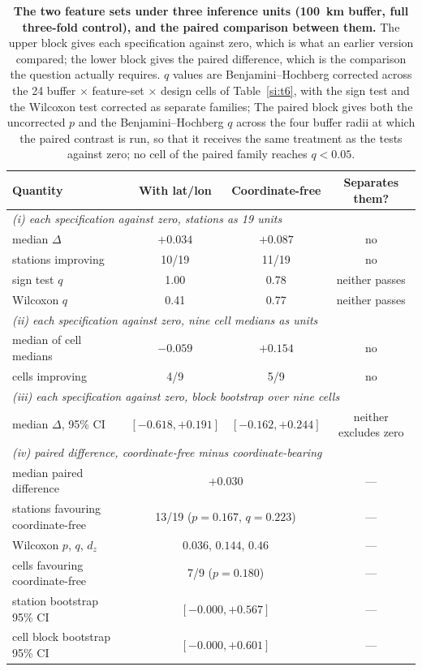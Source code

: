 \documentclass[11pt]{article}
\begin{document}
\begin{table}[htbp]\centering\footnotesize
\caption{\textbf{The two feature sets under three inference units (100~km buffer, full three-fold control), and the paired comparison between them.} The upper block gives each specification against zero, which is what an earlier version compared; the lower block gives the paired difference, which is the comparison the question actually requires. $q$ values are Benjamini--Hochberg corrected across the 24 buffer $\times$ feature-set $\times$ design cells of Table~\ref{si:t6}, with the sign test and the Wilcoxon test corrected as separate families; The paired block gives both the uncorrected $p$ and the Benjamini--Hochberg $q$ across the four buffer radii at which the paired contrast is run, so that it receives the same treatment as the tests against zero; no cell of the paired family reaches $q<0.05$.}
\label{si:t29}
\begin{tabular}{lccc}\toprule
Quantity & With lat/lon & Coordinate-free & Separates them? \\ \midrule
\multicolumn{4}{l}{\textit{(i) each specification against zero, stations as 19 units}} \\
median $\Delta$ & $+0.034$ & $+0.087$ & no \\
\quad stations improving & 10/19 & 11/19 & no \\
\quad sign test $q$ & 1.00 & 0.78 & neither passes \\
\quad Wilcoxon $q$ & 0.41 & 0.77 & neither passes \\
\multicolumn{4}{l}{\textit{(ii) each specification against zero, nine cell medians as units}} \\
median of cell medians & $-0.059$ & $+0.154$ & no \\
\quad cells improving & 4/9 & 5/9 & no \\
\multicolumn{4}{l}{\textit{(iii) each specification against zero, block bootstrap over nine cells}} \\
median $\Delta$, 95\% CI & $[-0.618,+0.191]$ & $[-0.162,+0.244]$ & neither excludes zero \\ \midrule
\multicolumn{4}{l}{\textit{(iv) paired difference, coordinate-free minus coordinate-bearing}} \\
median paired difference & \multicolumn{2}{c}{$+0.030$} & --- \\
\quad stations favouring coordinate-free & \multicolumn{2}{c}{13/19 ($p=0.167$, $q=0.223$)} & --- \\
\quad Wilcoxon $p$, $q$, $d_z$ & \multicolumn{2}{c}{$0.036$, \; $0.144$, \; $0.46$} & --- \\
\quad cells favouring coordinate-free & \multicolumn{2}{c}{7/9 ($p=0.180$)} & --- \\
\quad station bootstrap 95\% CI & \multicolumn{2}{c}{$[-0.000,+0.567]$} & --- \\
\quad cell block bootstrap 95\% CI & \multicolumn{2}{c}{$[-0.000,+0.601]$} & --- \\
\bottomrule\end{tabular}\end{table}
\end{document}
